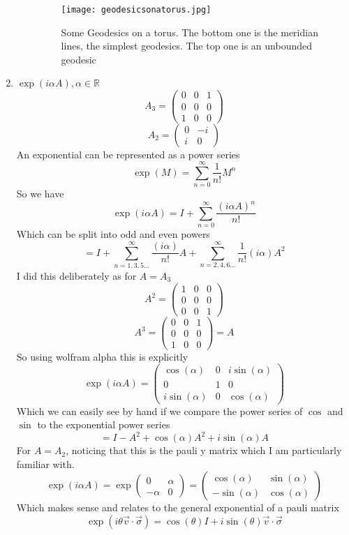 \documentclass[12pt]{article}
\begin{document}
\begin{enumerate}
\begin{enumerate}
\begin{figure}[h!]
  \texttt{[image: geodesicsonatorus.jpg]}
  \centering
  \caption{Some Geodesics on a torus. The bottom one is the meridian lines, the simplest geodesics. The top one is an unbounded geodesic }
\end{figure}
\end{enumerate}
\pagebreak
\item $\exp ( i \alpha A), \alpha \in \mathbb{R}$ 
$$ A_3 = \begin{pmatrix}
  0&0&1 \\ 0&0&0 \\ 1&0&0 
\end{pmatrix} $$
$$ A_2 = \begin{pmatrix}
  0& -i \\ i & 0 
\end{pmatrix} $$
An exponential can be represented as a power series 
$$ \exp (M) = \sum_{n=0}^{\infty} \frac{1}{n!} M^n $$ 
So we have 
$$ \exp(i \alpha A) = I + \sum_{n=0}^{\infty} \frac{(i \alpha A)^n}{n!} $$
Which can be split into odd and even powers 
$$ = I + \sum_{n=1,3,5 \ldots}^{\infty} \frac{(i \alpha)}{n!} A + \sum_{n = 2,4,6 \ldots}^{\infty} \frac{1}{n!} (i \alpha) A^2 $$
I did this deliberately as for $A=A_3$ 
$$ A^2 = \begin{pmatrix}
  1&0&0 \\ 0&0&0 \\ 0&0&1 
\end{pmatrix} $$
$$ A^3 = \begin{pmatrix}
  0&0&1 \\ 0&0&0 \\ 1&0&0 
\end{pmatrix} = A $$
So using wolfram alpha this is explicitly 
$$ \exp( i \alpha A) = \begin{pmatrix}
  \cos (\alpha) & 0 & i \sin(\alpha) \\ 0&1&0 \\ i \sin(\alpha) &0& \cos(\alpha) 
\end{pmatrix}$$
Which we can easily see by hand if we compare the power series of $\cos$ and $\sin$ to the exponential power series 
$$ = I - A^2 + \cos(\alpha) A^2 + i \sin (\alpha) A $$
For $A = A_2$, noticing that this is the pauli y matrix which I am particularly familiar with. 
$$ \exp (i \alpha A) = \exp \begin{pmatrix}
  0& \alpha \\ - \alpha & 0 
\end{pmatrix} = \begin{pmatrix}
  \cos (\alpha) & \sin(\alpha) \\ - \sin(\alpha) & \cos(\alpha) 
\end{pmatrix} $$
Which makes sense and relates to the general exponential of a pauli matrix 
$$ \exp(i \theta \vec{v} \cdot \vec{\sigma} ) = \cos(\theta)I + i \sin(\theta) \vec{v} \cdot \vec{\sigma} $$





\end{enumerate}
\end{document}
